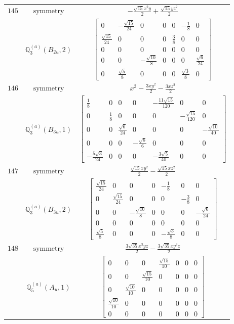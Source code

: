 \documentclass[fleqn,8pt,landscape]{jsarticle}
\begin{document}
\begin{longtable}{ccc}
$ 145 $ & $ \text{symmetry} $ & $ - \frac{\sqrt{15} x^{2} y}{2} + \frac{\sqrt{15} y z^{2}}{2} $ \\
$  $ & $ \mathbb{Q}_{3}^{(a)}(B_{2u},2) $ & $ \begin{bmatrix} 0 & - \frac{\sqrt{15}}{24} & 0 & 0 & 0 & - \frac{1}{8} & 0 \\ \frac{\sqrt{15}}{24} & 0 & 0 & 0 & \frac{3}{8} & 0 & 0 \\ 0 & 0 & 0 & 0 & 0 & 0 & 0 \\ 0 & 0 & - \frac{\sqrt{10}}{8} & 0 & 0 & 0 & \frac{\sqrt{6}}{24} \\ 0 & \frac{\sqrt{5}}{8} & 0 & 0 & 0 & \frac{\sqrt{3}}{8} & 0 \end{bmatrix} $ \\ \hline
$ 146 $ & $ \text{symmetry} $ & $ x^{3} - \frac{3 x y^{2}}{2} - \frac{3 x z^{2}}{2} $ \\
$  $ & $ \mathbb{Q}_{3}^{(a)}(B_{3u},1) $ & $ \begin{bmatrix} \frac{1}{8} & 0 & 0 & 0 & - \frac{11 \sqrt{15}}{120} & 0 & 0 \\ 0 & \frac{1}{8} & 0 & 0 & 0 & - \frac{\sqrt{15}}{120} & 0 \\ 0 & 0 & \frac{\sqrt{6}}{24} & 0 & 0 & 0 & - \frac{\sqrt{10}}{40} \\ 0 & 0 & 0 & - \frac{\sqrt{6}}{6} & 0 & 0 & 0 \\ - \frac{5 \sqrt{3}}{24} & 0 & 0 & 0 & - \frac{3 \sqrt{5}}{40} & 0 & 0 \end{bmatrix} $ \\ \hline
$ 147 $ & $ \text{symmetry} $ & $ \frac{\sqrt{15} x y^{2}}{2} - \frac{\sqrt{15} x z^{2}}{2} $ \\
$  $ & $ \mathbb{Q}_{3}^{(a)}(B_{3u},2) $ & $ \begin{bmatrix} \frac{\sqrt{15}}{24} & 0 & 0 & 0 & - \frac{1}{8} & 0 & 0 \\ 0 & \frac{\sqrt{15}}{24} & 0 & 0 & 0 & - \frac{3}{8} & 0 \\ 0 & 0 & - \frac{\sqrt{10}}{8} & 0 & 0 & 0 & - \frac{\sqrt{6}}{24} \\ 0 & 0 & 0 & 0 & 0 & 0 & 0 \\ \frac{\sqrt{5}}{8} & 0 & 0 & 0 & - \frac{\sqrt{3}}{8} & 0 & 0 \end{bmatrix} $ \\ \hline
$ 148 $ & $ \text{symmetry} $ & $ \frac{3 \sqrt{35} x^{3} y z}{2} - \frac{3 \sqrt{35} x y^{3} z}{2} $ \\
$  $ & $ \mathbb{Q}_{5}^{(a)}(A_{u},1) $ & $ \begin{bmatrix} 0 & 0 & 0 & \frac{\sqrt{15}}{10} & 0 & 0 & 0 \\ 0 & 0 & \frac{\sqrt{15}}{10} & 0 & 0 & 0 & 0 \\ 0 & \frac{\sqrt{10}}{10} & 0 & 0 & 0 & 0 & 0 \\ \frac{\sqrt{10}}{10} & 0 & 0 & 0 & 0 & 0 & 0 \\ 0 & 0 & 0 & 0 & 0 & 0 & 0 \end{bmatrix} $ \\ \hline

\end{longtable}
\end{document}
